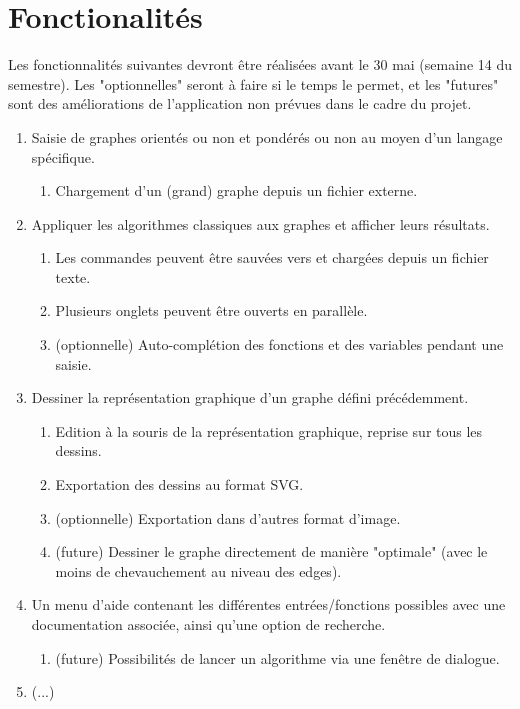 \documentclass[french]{article}
\begin{document}
	\section{Fonctionalités}
		Les fonctionnalités suivantes devront être réalisées avant le 30 mai (semaine 14 du semestre). Les "optionnelles" seront à faire si le temps le permet, et les "futures" sont des améliorations de l'application non prévues dans le cadre du projet.
		\begin{enumerate}
			\item Saisie de graphes orientés ou non et pondérés ou non au moyen d'un langage spécifique.
			\begin{enumerate}
				\item Chargement d'un (grand) graphe depuis un fichier externe.
			\end{enumerate}
			
			\item Appliquer les algorithmes classiques aux graphes et afficher leurs résultats.
			\begin{enumerate}
				\item Les commandes peuvent être sauvées vers et chargées depuis un fichier texte.
				\item Plusieurs onglets peuvent être ouverts en parallèle.
				\item (optionnelle) Auto-complétion des fonctions et des variables pendant une saisie.
			\end{enumerate}
			
			\item Dessiner la représentation graphique d'un graphe défini précédemment.
			\begin{enumerate}
				\item Edition à la souris de la représentation graphique, reprise sur tous les dessins.
				\item Exportation des dessins au format SVG.
				\item (optionnelle) Exportation dans d'autres format d'image.
				\item (future) Dessiner le graphe directement de manière "optimale" (avec le moins de chevauchement au niveau des edges).
			\end{enumerate}
			
			\item Un menu d'aide contenant les différentes entrées/fonctions possibles avec une documentation associée, ainsi qu'une option de recherche.
			\begin{enumerate}
				\item (future) Possibilités de lancer un algorithme via une fenêtre de dialogue.
			\end{enumerate}
		
			\item (...)
		\end{enumerate}
		
\end{document}
